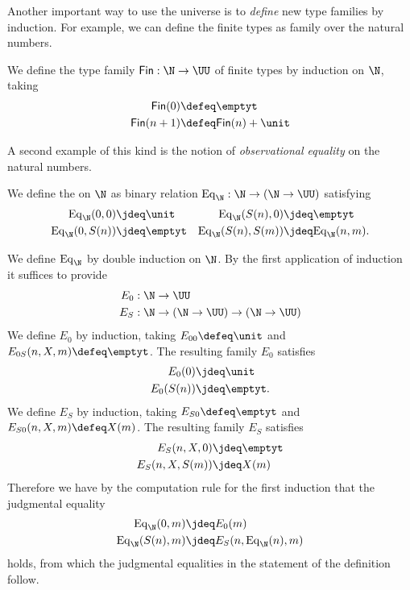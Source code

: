 Another important way to use the universe is to \emph{define} new type families by induction. For example, we can define the finite types as family over the natural numbers.

\begin{defn}
We define the type family $\mathsf{Fin}:\N\to\UU$ of finite types by induction on $\N$, taking
\begin{align*}
\mathsf{Fin}(0) & \defeq \emptyt \\
\mathsf{Fin}(n+1) & \defeq \mathsf{Fin}(n)+\unit
\end{align*}
\end{defn}

A second example of this kind is the notion of \emph{observational equality} on the natural numbers.

\begin{defn}\label{defn:obs_nat}
We define the  on $\N$ as binary relation $\mathrm{Eq}_\N:\N\to(\N\to\UU)$ satisfying
\begin{align*}
\mathrm{Eq}_\N(0,0) & \jdeq \unit & \mathrm{Eq}_\N(S(n),0) & \jdeq \emptyt \\
\mathrm{Eq}_\N(0,S(n)) & \jdeq \emptyt & \mathrm{Eq}_\N(S(n),S(m)) & \jdeq \mathrm{Eq}_\N(n,m).
\end{align*}
\end{defn}

\begin{constr}
We define $\mathrm{Eq}_\N$ by double induction on $\N$. By the first application of induction it suffices to provide
\begin{align*}
E_0 & : \N\to\UU \\
E_S & : \N\to (\N\to\UU)\to(\N\to\UU)
\end{align*}
We define $E_0$ by induction, taking $E_{00}\defeq \unit$ and $E_{0S}(n,X,m)\defeq \emptyt$. The resulting family $E_0$ satisfies
\begin{align*}
E_0(0) & \jdeq \unit \\
E_0(S(n)) & \jdeq \emptyt.
\end{align*} 
We define $E_S$ by induction, taking $E_{S0}\defeq \emptyt$ and $E_{S0}(n,X,m)\defeq X(m)$. The resulting family $E_S$ satisfies
\begin{align*}
E_S(n,X,0) & \jdeq \emptyt \\
E_S(n,X,S(m)) & \jdeq X(m) 
\end{align*}
Therefore we have by the computation rule for the first induction that the judgmental equality
\begin{align*}
\mathrm{Eq}_\N(0,m) & \jdeq E_0(m) \\
\mathrm{Eq}_\N(S(n),m) & \jdeq E_S(n,\mathrm{Eq}_\N(n),m)
\end{align*}
holds, from which the judgmental equalities in the statement of the definition follow.
\end{constr}

